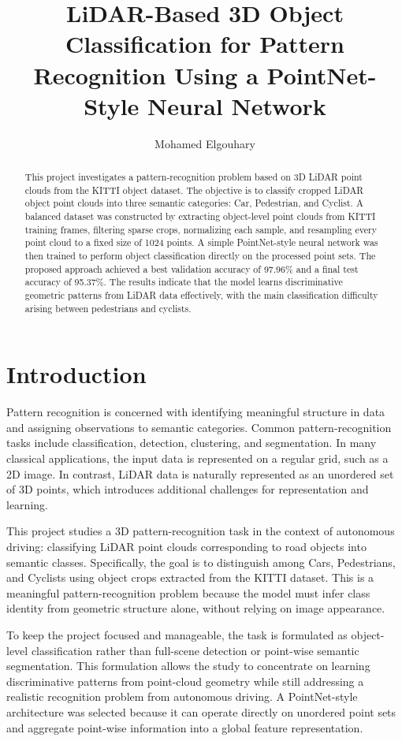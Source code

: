 \documentclass[12pt]{article}
\title{\textbf{LiDAR-Based 3D Object Classification for Pattern Recognition Using a PointNet-Style Neural Network}}
\author{Mohamed Elgouhary}
\date{}
\begin{document}
\maketitle

\begin{abstract}
This project investigates a pattern-recognition problem based on 3D LiDAR point clouds from the KITTI object dataset. The objective is to classify cropped LiDAR object point clouds into three semantic categories: Car, Pedestrian, and Cyclist. A balanced dataset was constructed by extracting object-level point clouds from KITTI training frames, filtering sparse crops, normalizing each sample, and resampling every point cloud to a fixed size of 1024 points. A simple PointNet-style neural network was then trained to perform object classification directly on the processed point sets. The proposed approach achieved a best validation accuracy of 97.96\% and a final test accuracy of 95.37\%. The results indicate that the model learns discriminative geometric patterns from LiDAR data effectively, with the main classification difficulty arising between pedestrians and cyclists.
\end{abstract}

\section{Introduction}

Pattern recognition is concerned with identifying meaningful structure in data and assigning observations to semantic categories. Common pattern-recognition tasks include classification, detection, clustering, and segmentation. In many classical applications, the input data is represented on a regular grid, such as a 2D image. In contrast, LiDAR data is naturally represented as an unordered set of 3D points, which introduces additional challenges for representation and learning.

This project studies a 3D pattern-recognition task in the context of autonomous driving: classifying LiDAR point clouds corresponding to road objects into semantic classes. Specifically, the goal is to distinguish among Cars, Pedestrians, and Cyclists using object crops extracted from the KITTI dataset. This is a meaningful pattern-recognition problem because the model must infer class identity from geometric structure alone, without relying on image appearance.

To keep the project focused and manageable, the task is formulated as object-level classification rather than full-scene detection or point-wise semantic segmentation. This formulation allows the study to concentrate on learning discriminative patterns from point-cloud geometry while still addressing a realistic recognition problem from autonomous driving. A PointNet-style architecture was selected because it can operate directly on unordered point sets and aggregate point-wise information into a global feature representation.
\end{document}
